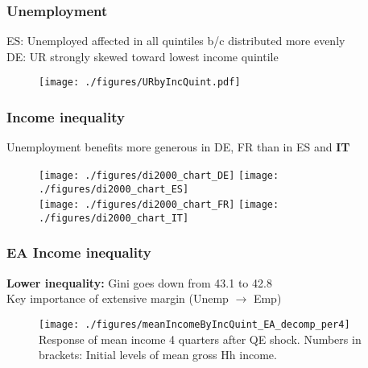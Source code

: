 \documentclass[pdflatex,aspectratio=169]{beamer}
\newcommand{\jemph}[1]{{\color{StataDarkBlue}#1}}
\newcommand{\jbemph}[1]{\textbf{\color{SlideNavy}#1}}
\begin{document}
\begin{frame}\frametitle{\bf Unemployment}
ES: Unemployed affected in all quintiles b/c distributed more evenly\\
DE: UR strongly skewed toward lowest income quintile
\begin{figure}
\begin{center}
\texttt{[image: ./figures/URbyIncQuint.pdf]}
\end{center}
\end{figure}
\end{frame}


\begin{frame}\frametitle{\bf Income inequality}
Unemployment benefits more generous in DE, FR than in ES and \textbf{IT}
\begin{figure}
\begin{center}
\texttt{[image: ./figures/di2000\_chart\_DE]}
\texttt{[image: ./figures/di2000\_chart\_ES]}\\
\texttt{[image: ./figures/di2000\_chart\_FR]}
\texttt{[image: ./figures/di2000\_chart\_IT]}
\end{center}
\end{figure}

\end{frame}


\begin{frame}\frametitle{\bf EA Income inequality}
\jbemph{Lower inequality:} Gini goes down from 43.1 to 42.8\\
\jemph{Key importance of extensive margin (Unemp ${}\rightarrow{}$ Emp)}
\begin{figure}
\begin{center}
\texttt{[image: ./figures/meanIncomeByIncQuint\_EA\_decomp\_per4]}\\[-2mm]
{\tiny Response of mean income 4 quarters after QE shock. Numbers in brackets: Initial levels of mean gross Hh income. }
\end{center}
\end{figure}

\end{frame}
\end{document}
